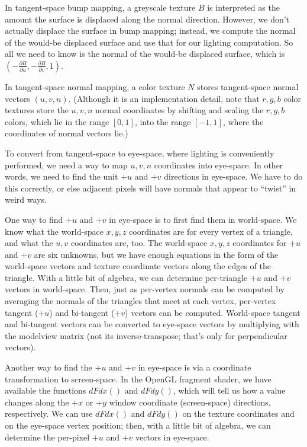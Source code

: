 \documentclass{article}
\begin{document}
In tangent-space bump mapping, a greyscale texture $B$ is interpreted as
the amount the surface is displaced along the normal direction.
However, we don't actually displace the surface in bump mapping; instead, we
compute the normal of the would-be displaced surface and use that for our
lighting computation.  So all we need to know is the normal of the would-be
displaced surface, which is
$( -\frac{\partial{B}}{\partial u}, -\frac{\partial{B}}{\partial v}, 1 )$.

In tangent-space normal mapping, a color texture $N$ stores
tangent-space normal vectors $(u,v,n)$.
(Although it is an implementation detail, note that $r,g,b$ color textures
store the $u,v,n$ normal coordinates by shifting and scaling the $r,g,b$
colors, which lie in the range $[0,1]$, into the range $[-1,1]$, where
the coordinates of normal vectors lie.)

To convert from tangent-space to eye-space, where lighting is conveniently
performed, we need a way to map $u,v,n$ coordinates into eye-space.
In other words, we need to find the unit $+u$ and $+v$ directions
in eye-space.
We have to do this correctly, or else adjacent pixels will have normals
that appear to ``twist'' in weird ways.

One way to find $+u$ and $+v$ in eye-space is to first find them in world-space.
We know what the world-space $x,y,z$
coordinates are for every vertex of a triangle, and what the $u,v$ coordinates
are, too.  The world-space $x,y,z$ coordinates for $+u$ and $+v$ are six unknowns,
but we have enough equations in the form of the world-space vectors and
texture coordinate vectors along the edges of the triangle.
With a little bit of algebra, we can determine per-triangle $+u$ and $+v$ vectors
in world-space.  Then, just as per-vertex normals can be
computed by averaging the normals of the triangles that meet at each vertex,
per-vertex tangent ($+u$) and bi-tangent ($+v$) vectors can be computed.
World-space tangent and bi-tangent vectors can be converted to eye-space
vectors by multiplying with the modelview matrix (not its inverse-transpose;
that's only for perpendicular vectors).

Another way to find the $+u$ and $+v$ in eye-space is via a coordinate
transformation to screen-space.  In the OpenGL fragment shader,
we have available the functions $dFdx()$ and $dFdy()$, which
will tell us how a value changes along the $+x$ or $+y$
window coordinate (screen-space) directions, respectively.
We can use $dFdx()$ and $dFdy()$ on the texture coordinates
and on the eye-space vertex position; then, with a little bit of algebra, we
can determine the per-pixel $+u$ and $+v$ vectors in eye-space.
\end{document}
